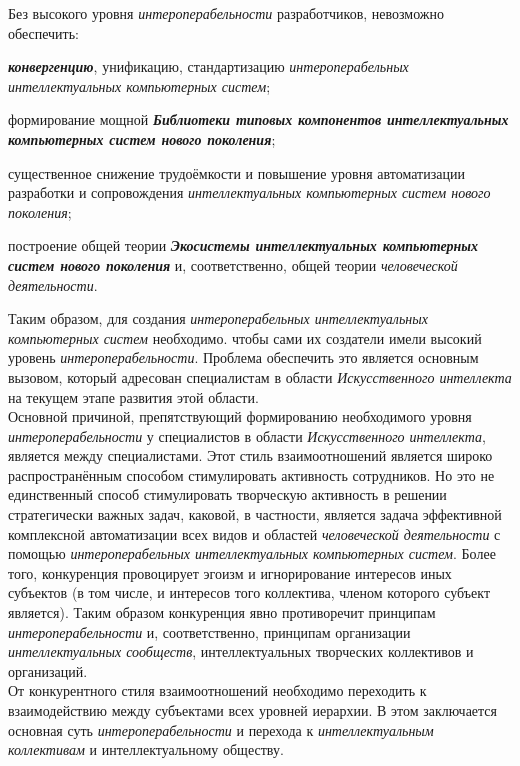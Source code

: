 \begin{textitemize}
	Без высокого уровня \textit{интероперабельности} разработчиков, невозможно обеспечить:
	\begin{textitemize}
		\item \textbf{\textit{конвергенцию}}, унификацию, стандартизацию \textit{интероперабельных интеллектуальных компьютерных систем};
		\item формирование мощной \textbf{\textit{Библиотеки типовых компонентов интеллектуальных компьютерных систем нового поколения}};
		\item существенное снижение трудоёмкости и повышение уровня автоматизации разработки и сопровождения \textit{интеллектуальных компьютерных систем  нового поколения};
		\item построение общей теории \textbf{\textit{Экосистемы интеллектуальных компьютерных систем нового поколения}} и, соответственно, общей теории \textit{человеческой деятельности}.
	\end{textitemize}

		Таким образом, для создания \textit{интероперабельных интеллектуальных компьютерных систем} необходимо. чтобы сами их создатели имели высокий уровень \textit{интероперабельности}. Проблема обеспечить это является основным вызовом, который адресован специалистам в области \textit{Искусственного интеллекта} на текущем этапе развития этой области.\\
		Основной причиной, препятствующий формированию необходимого уровня \textit{интероперабельности} у специалистов в области \textit{Искусственного интеллекта}, является  между специалистами. Этот стиль взаимоотношений является широко распространённым способом стимулировать активность сотрудников. Но это не единственный способ стимулировать творческую активность в решении стратегически важных задач, каковой, в частности, является задача эффективной комплексной автоматизации всех видов и областей \textit{человеческой деятельности} с помощью \textit{интероперабельных интеллектуальных компьютерных систем}. Более того, конкуренция провоцирует эгоизм и игнорирование интересов иных субъектов (в том числе, и интересов того коллектива, членом которого субъект является). Таким образом конкуренция явно противоречит принципам \textit{интероперабельности} и, соответственно, принципам организации \textit{интеллектуальных сообществ}, интеллектуальных творческих коллективов и организаций.\\
		От конкурентного стиля взаимоотношений необходимо переходить к  взаимодействию между субъектами всех уровней иерархии. В этом заключается основная суть \textit{интероперабельности} и перехода к \textit{интеллектуальным коллективам} и интеллектуальному обществу.
	\end{textitemize}

